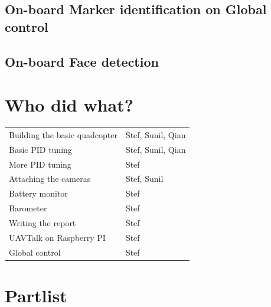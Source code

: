 \documentclass[11pt, a4paper, onecolumn, oneside, parskip=half]{scrartcl}
\begin{document}
\subsection{On-board Marker identification on Global control}

\subsection{On-board Face detection}

\appendix
\newpage
\section{Who did what?}
\begin{tabular}{ll}
Building the basic quadcopter & Stef, Sunil, Qian \\
Basic PID tuning & Stef, Sunil, Qian \\
More PID tuning & Stef \\
Attaching the cameras & Stef, Sunil \\
Battery monitor & Stef \\
Barometer & Stef \\
Writing the report & Stef \\
UAVTalk on Raspberry PI & Stef \\
Global control & Stef \\
\end{tabular}

\section{Partlist}
\end{document}
